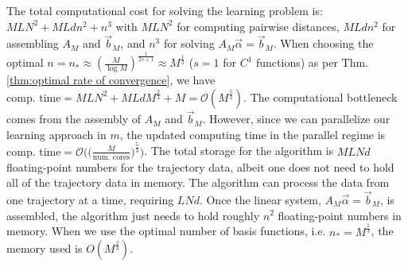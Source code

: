 \documentclass[11pt]{article}
\begin{document}
The total computational cost for solving the learning problem is: $MLN^2 + MLdn^2 + n^3$ with $MLN^2$ for computing pairwise distances, $MLdn^2$ for assembling $A_M$ and $\vec{b}_M$, and $n^3$ for solving $A_M\vec{\alpha} = \vec{b}_M$.   When choosing the optimal $n = n_* \approx (\frac{M}{\log M})^{\frac{1}{2s + 1}} \approx M^{\frac{1}{3}}$ ($s = 1$ for $C^1$ functions) as per Thm. \ref{thm:optimal rate of convergence}, we have
$\text{comp. time} = MLN^2 + MLdM^{\frac{2}{3}} + M = \mathcal{O}(M^{\frac{5}{3}})$.
The computational bottleneck comes from the assembly of $A_M$ and $\vec{b}_M$.  However, since we can parallelize our learning approach in $m$, the updated computing time in the parallel regime is
$\text{comp. time} = \mathcal{O}\Big(\Big(\frac{M}{\text{num. cores}}\Big)^{\frac{5}{3}}\Big)$. 
The total storage for the algorithm is $MLNd$ floating-point numbers for the trajectory data,  albeit one does not need to hold all of the trajectory data in memory.  The algorithm can process the data from one trajectory at a time, requiring $LNd$.  Once the linear system, $A_M\vec{\alpha} = \vec{b}_M$, is assembled, the algorithm just needs to hold roughly $n^2$ floating-point numbers in memory.   When we use the optimal number of basis functions, i.e. $n_* = M^{\frac{1}{3}}$, the memory used is $O(M^{\frac{2}{3}})$.
%
\end{document}
